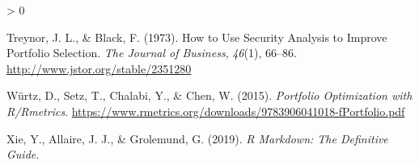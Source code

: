 \documentclass[
  11pt,
]{article}
\newlength{\cslhangindent}
\newenvironment{CSLReferences}[2] %
 {%
  \setlength{\parindent}{0pt}
  \ifodd #1 \everypar{\setlength{\hangindent}{\cslhangindent}}\ignorespaces\fi
  \ifnum #2 > 0
  \setlength{\parskip}{#2\baselineskip}
  \fi
 }%
 {}
\begin{document}
\begin{CSLReferences}{1}{0}
\leavevmode\hypertarget{ref-Treynor1973}{}%
Treynor, J. L., \& Black, F. (1973). {How to Use Security Analysis to
Improve Portfolio Selection}. \emph{The Journal of Business},
\emph{46}(1), 66--86. \url{http://www.jstor.org/stable/2351280}

\leavevmode\hypertarget{ref-Wurtz2015}{}%
Würtz, D., Setz, T., Chalabi, Y., \& Chen, W. (2015). \emph{{Portfolio
Optimization with R/Rmetrics}}.
\url{https://www.rmetrics.org/downloads/9783906041018-fPortfolio.pdf}

\leavevmode\hypertarget{ref-Xie2019}{}%
Xie, Y., Allaire, J. J., \& Grolemund, G. (2019). \emph{{R Markdown: The
Definitive Guide}}.

\end{CSLReferences}
\end{document}
